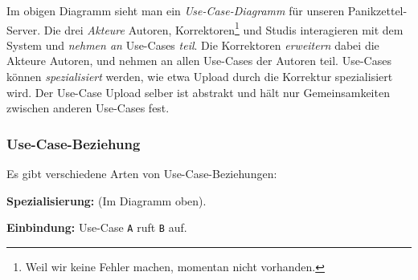 \documentclass{panikzettel}
\begin{document}

Im obigen Diagramm sieht man ein \emph{Use-Case-Diagramm} für unseren Panikzettel-Server.
Die drei \emph{Akteure} Autoren, Korrektoren\footnote{Weil wir keine Fehler machen, momentan nicht vorhanden.} und Studis interagieren mit dem System und \emph{nehmen an} Use-Cases \emph{teil}.
Die Korrektoren \emph{erweitern} dabei die Akteure Autoren, und nehmen an allen Use-Cases der Autoren teil.
Use-Cases können \emph{spezialisiert} werden, wie etwa Upload durch die Korrektur spezialisiert wird.
Der Use-Case Upload selber ist abstrakt und hält nur Gemeinsamkeiten zwischen anderen Use-Cases fest.

\subsubsection{Use-Case-Beziehung}

Es gibt verschiedene Arten von Use-Case-Beziehungen:

\textbf{Spezialisierung:} (Im Diagramm oben).


\textbf{Einbindung:} Use-Case \lstinline{A} ruft \lstinline{B} auf.

\end{document}

